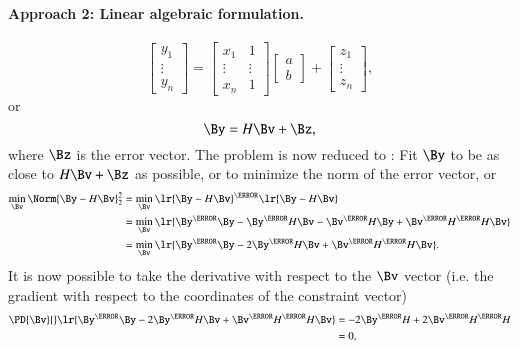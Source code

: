\paragraph{Approach 2:  Linear algebraic formulation.}
\begin{equation}\label{eqn:L1introduction:220}
\begin{bmatrix}
y_1 \\
\vdots \\
y_n
\end{bmatrix}
=
\begin{bmatrix}
x_1 & 1 \\
\vdots & \vdots \\
x_n & 1
\end{bmatrix}
\begin{bmatrix}
a \\
b
\end{bmatrix}
+
\begin{bmatrix}
z_1 \\
\vdots \\
z_n
\end{bmatrix}
,
\end{equation}
or
\begin{equation}\label{eqn:L1introduction:240}
\By = H \Bv + \Bz,
\end{equation}
where \( \Bz \) is the error vector.  The problem is now reduced to : Fit \( \By \) to be as close to \( H \Bv + \Bz \) as possible, or to minimize the norm of the error vector, or
\begin{equation}\label{eqn:L1introduction:260}
\begin{aligned}
\min_\Bv \Norm{ \By - H \Bv }^2_2 &= \min_\Bv \lr{ \By - H \Bv }^\T \lr{ \By - H \Bv } \\
&= \min_\Bv \lr{ \By^\T \By - \By^\T H \Bv - \Bv^\T H \By + \Bv^\T H^\T H \Bv } \\
&= \min_\Bv \lr{ \By^\T \By - 2 \By^\T H \Bv + \Bv^\T H^\T H \Bv }.
\end{aligned}
\end{equation}
%
It is now possible to take the derivative with respect to the \( \Bv \) vector (i.e. the gradient with respect to the coordinates of the constraint vector)
\begin{equation}\label{eqn:L1introduction:280}
\begin{aligned}
\PD{\Bv}{}
\lr{ \By^\T \By - 2 \By^\T H \Bv + \Bv^\T H^\T H \Bv }
&= - 2 \By^\T H + 2 \Bv^\T H^\T H \\
&= 0,
\end{aligned}
\end{equation}

